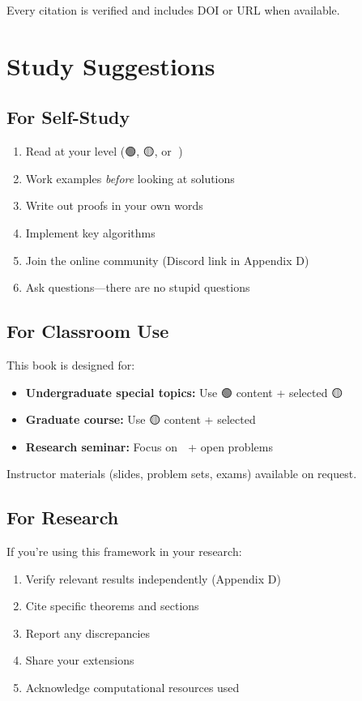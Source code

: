 Every citation is verified and includes DOI or URL when available.

\section*{Study Suggestions}

\subsection*{For Self-Study}

\begin{enumerate}
\item Read at your level (🟢, 🟡, or 🔴)
\item Work examples \textit{before} looking at solutions
\item Write out proofs in your own words
\item Implement key algorithms
\item Join the online community (Discord link in Appendix D)
\item Ask questions—there are no stupid questions
\end{enumerate}

\subsection*{For Classroom Use}

This book is designed for:
\begin{itemize}
\item \textbf{Undergraduate special topics:} Use 🟢 content + selected 🟡
\item \textbf{Graduate course:} Use 🟡 content + selected 🔴
\item \textbf{Research seminar:} Focus on 🔴 + open problems
\end{itemize}

Instructor materials (slides, problem sets, exams) available on request.

\subsection*{For Research}

If you're using this framework in your research:
\begin{enumerate}
\item Verify relevant results independently (Appendix D)
\item Cite specific theorems and sections
\item Report any discrepancies
\item Share your extensions
\item Acknowledge computational resources used
\end{enumerate}

